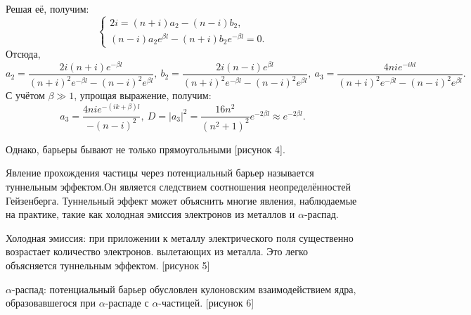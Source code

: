 Решая её, получим:
\[
    \left\{
    \begin{array}{l}
        2i = (n+i)a_2 - (n-i)b_2, \\
        (n-i)a_2 e^{\beta l} - (n+i)b_2 e^{-\beta l} = 0.
    \end{array}
    \right.
\]
Отсюда,
\[
    a_2 = \frac{2i(n+i)e^{-\beta l}}{(n+i)^2e^{-\beta l} - (n-i)^2e^{\beta l}},\  
    b_2 = \frac{2i(n-i)e^{\beta l}}{(n+i)^2e^{-\beta l} - (n-i)^2e^{\beta l}},\ 
    a_3 = \frac{4nie^{-ikl}}{(n+i)^2 e^{-\beta l} - (n-i)^2 e^{\beta l}}.
\]
С учётом \( \beta \gg 1 \), упрощая выражение, получим:
\[
    a_3 = \frac{4nie^{-(ik+\beta)l}}{-(n-i)^2}, \ 
    D = |a_3|^2 = \frac{16n^2}{(n^2 + 1)^2} e^{-2\beta l} \approx e^{-2\beta l}. 
\]

Однако, барьеры бывают не только прямоугольными [рисунок 4].

Явление прохождения частицы через потенциальный барьер называется туннельным
эффектом.Он является следствием соотношения неопределённостей Гейзенберга.
Туннельный эффект может объяснить многие явления, наблюдаемые на практике, такие
как холодная эмиссия электронов из металлов и \( \alpha \)-распад.

Холодная эмиссия: при приложении к металлу электрического поля существенно
возрастает количество электронов. вылетающих из металла. Это легко объясняется 
туннельным эффектом. [рисунок 5]

\( \alpha \)-распад: потенциальный барьер обусловлен кулоновским взаимодействием
ядра, образовавшегося при \( \alpha \)-распаде с \( \alpha \)-частицей.
[рисунок 6]
\newpage
